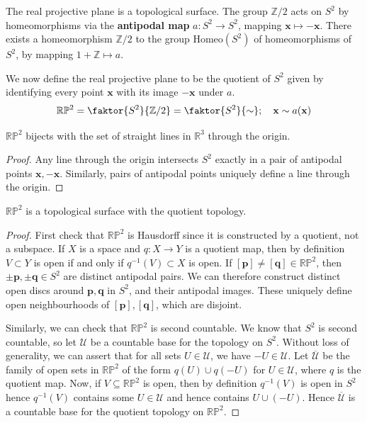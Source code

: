 \documentclass[a4paper,11pt]{article}
\begin{document}
\begin{example}
	The real projective plane is a topological surface.
	The group \( \mathbb Z / 2 \) acts on \( S^2 \) by homeomorphisms via the \textbf{antipodal map} \( a \colon S^2 \to S^2 \), mapping \( \mathbf{x} \mapsto -\mathbf x \).
	There exists a homeomorphism \( \mathbb Z / 2 \) to the group \( \mathrm{Homeo}(S^2) \) of homeomorphisms of \( S^2 \), by mapping \( 1 + \mathbb Z \mapsto a \).

	We now define the real projective plane to be the quotient of \( S^2 \) given by identifying every point \( \mathbf x \) with its image \( -\mathbf x \) under \( a \).
	\[
		\mathbb R \mathbb P^2 = \faktor{S^2}{\mathbb Z/2} = \faktor{S^2}{\sim};\quad \mathbf{x} \sim a(\mathbf{x})
	\]
	\begin{lemma}
		\( \mathbb R \mathbb P^2 \) bijects with the set of straight lines in \( \mathbb R^3 \) through the origin.
	\end{lemma}
	\begin{proof}
		Any line through the origin intersects \( S^2 \) exactly in a pair of antipodal points \( \mathbf{x}, -\mathbf{x} \).
		Similarly, pairs of antipodal points uniquely define a line through the origin.
	\end{proof}
	\begin{lemma}
		\( \mathbb R \mathbb P^2 \) is a topological surface with the quotient topology.
	\end{lemma}
	\begin{proof}
		First check that \( \mathbb R \mathbb P^2 \) is Hausdorff since it is constructed by a quotient, not a subspace.
		If \( X \) is a space and \( q \colon X \to Y \) is a quotient map, then by definition \( V \subset Y \) is open if and only if \( q^{-1}(V) \subset X \) is open.
		If \( [\mathbf p] \neq [\mathbf q] \in \mathbb R \mathbb P^2 \), then \( \pm \mathbf p, \pm \mathbf q \in S^2 \) are distinct antipodal pairs.
		We can therefore construct distinct open discs around \( \mathbf p, \mathbf q \) in \( S^2 \), and their antipodal images.
		These uniquely define open neighbourhoods of \( [\mathbf p], [\mathbf q] \), which are disjoint.

		Similarly, we can check that \( \mathbb R \mathbb P^2 \) is second countable.
		We know that \( S^2 \) is second countable, so let \( \mathcal U \) be a countable base for the topology on \( S^2 \).
		Without loss of generality, we can assert that for all sets \( U \in \mathcal U \), we have \( -U \in \mathcal U \).
		Let \( \overline{\mathcal U} \) be the family of open sets in \( \mathbb R \mathbb P^2 \) of the form \( q(U) \cup q(-U) \) for \( U \in \mathcal U \), where \( q \) is the quotient map.
		Now, if \( V \subseteq \mathbb R \mathbb P^2 \) is open, then by definition \( q^{-1}(V) \) is open in \( S^2 \) hence \( q^{-1}(V) \) contains some \( U \in \mathcal U \) and hence contains \( U \cup (-U) \).
		Hence \( \overline{\mathcal U} \) is a countable base for the quotient topology on \( \mathbb R \mathbb P^2 \).


\end{proof}
\end{example}
\end{document}
